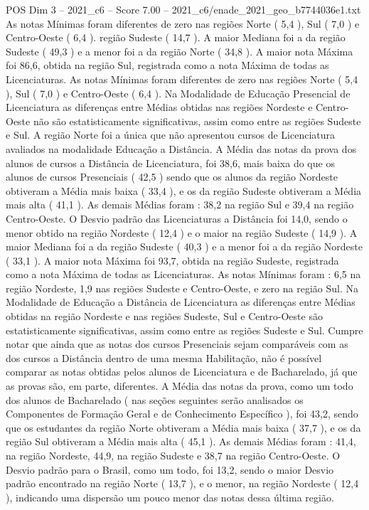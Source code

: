 \begin{textsample}{POS Dim 3 – 2021\_c6 – Score 7.00 – 2021\_c6/enade\_2021\_geo\_b7744036e1.txt}
As notas Mínimas foram diferentes de zero nas regiões Norte ( 5,4 ), Sul ( 7,0 ) e Centro-Oeste ( 6,4 ). região Sudeste ( 14,7 ).
A maior Mediana foi a da região Sudeste ( 49,3 ) e a menor foi a da região Norte ( 34,8 ).
A maior nota Máxima foi 86,6, obtida na região Sul, registrada como a nota Máxima de todas as Licenciaturas.
As notas Mínimas foram diferentes de zero nas regiões Norte ( 5,4 ), Sul ( 7,0 ) e Centro-Oeste ( 6,4 ).
Na Modalidade de Educação Presencial de Licenciatura as diferenças entre Médias obtidas nas regiões Nordeste e Centro-Oeste não são estatisticamente significativas, assim como entre as regiões Sudeste e Sul.
A região Norte foi a única que não apresentou cursos de Licenciatura avaliados na modalidade Educação a Distância.
A Média das notas da prova dos alunos de cursos a Distância de Licenciatura, foi 38,6, mais baixa do que os alunos de cursos Presenciais ( 42,5 ) sendo que os alunos da região Nordeste obtiveram a Média mais baixa ( 33,4 ), e os da região Sudeste obtiveram a Média mais alta ( 41,1 ).
As demais Médias foram : 38,2 na região Sul e 39,4 na região Centro-Oeste.
O Desvio padrão das Licenciaturas a Distância foi 14,0, sendo o menor obtido na região Nordeste ( 12,4 ) e o maior na região Sudeste ( 14,9 ).
A maior Mediana foi a da região Sudeste ( 40,3 ) e a menor foi a da região Nordeste ( 33,1 ).
A maior nota Máxima foi 93,7, obtida na região Sudeste, registrada como a nota Máxima de todas as Licenciaturas.
As notas Mínimas foram : 6,5 na região Nordeste, 1,9 nas regiões Sudeste e Centro-Oeste, e zero na região Sul.
Na Modalidade de Educação a Distância de Licenciatura as diferenças entre Médias obtidas na região Nordeste e nas regiões Sudeste, Sul e Centro-Oeste são estatisticamente significativas, assim como entre as regiões Sudeste e Sul.
Cumpre notar que ainda que as notas dos cursos Presenciais sejam comparáveis com as dos cursos a Distância dentro de uma mesma Habilitação, não é possível comparar as notas obtidas pelos alunos de Licenciatura e de Bacharelado, já que as provas são, em parte, diferentes.
A Média das notas da prova, como um todo dos alunos de Bacharelado ( nas seções seguintes serão analisados os Componentes de Formação Geral e de Conhecimento Específico ), foi 43,2, sendo que os estudantes da região Norte obtiveram a Média mais baixa ( 37,7 ), e os da região Sul obtiveram a Média mais alta ( 45,1 ).
As demais Médias foram : 41,4, na região Nordeste, 44,9, na região Sudeste e 38,7 na região Centro-Oeste.
O Desvio padrão para o Brasil, como um todo, foi 13,2, sendo o maior Desvio padrão encontrado na região Norte ( 13,7 ), e o menor, na região Nordeste ( 12,4 ), indicando uma dispersão um pouco menor das notas dessa última região.

\end{textsample}
